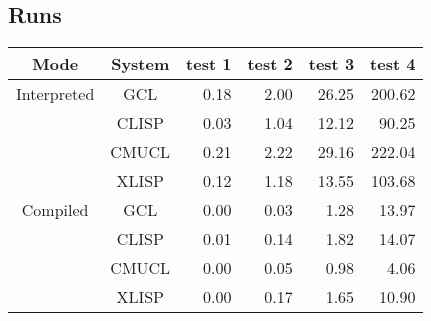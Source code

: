 \documentclass{amsart}
\begin{document}
\subsection{Runs}

\begin{table}[H]
\centering
\begin{tabular}{||c|c||r|r|r|r||}\hline
Mode & System & test 1 & test 2 & test 3 & test 4 \\\hline\hline
Interpreted & GCL & 0.18 & 2.00 & 26.25 & 200.62 \\
& CLISP & 0.03 & 1.04 & 12.12 & 90.25 \\
& CMUCL & 0.21 & 2.22 & 29.16 & 222.04 \\
& XLISP & 0.12 & 1.18 & 13.55 & 103.68 \\\hline
Compiled & GCL & 0.00 & 0.03 & 1.28 & 13.97 \\
& CLISP & 0.01 & 0.14 & 1.82 & 14.07 \\
& CMUCL & 0.00 & 0.05 & 0.98 & 4.06 \\
& XLISP & 0.00 & 0.17 & 1.65 & 10.90 \\\hline
\end{tabular}
\end{table}
\end{document}
